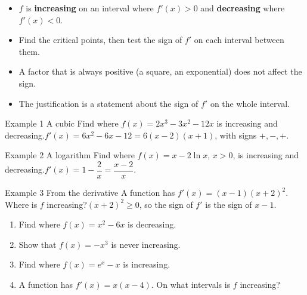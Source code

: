 \documentclass[11pt]{article}
\begin{document}

\begin{ideabox}
\begin{itemize}[leftmargin=*,itemsep=2pt,topsep=2pt]
  \item $f$ is \textbf{increasing} on an interval where $f'(x)>0$ and \textbf{decreasing} where $f'(x)<0$.
  \item Find the critical points, then test the sign of $f'$ on each interval between them.
  \item A factor that is always positive (a square, an exponential) does not affect the sign.
  \item The justification is a statement about the sign of $f'$ on the whole interval.
\end{itemize}
\end{ideabox}

\begin{example}{Example 1 \textperiodcentered{} A cubic}
Find where $f(x)=2x^3-3x^2-12x$ is increasing and decreasing.\soln $f'(x)=6x^2-6x-12=6(x-2)(x+1)$, with signs $+,-,+$.
\end{example}

\begin{example}{Example 2 \textperiodcentered{} A logarithm}
Find where $f(x)=x-2\ln x$, $x>0$, is increasing and decreasing.\soln $f'(x)=1-\dfrac2x=\dfrac{x-2}{x}$.
\end{example}

\begin{example}{Example 3 \textperiodcentered{} From the derivative}
A function has $f'(x)=(x-1)(x+2)^2$. Where is $f$ increasing?\soln $(x+2)^2\ge0$, so the sign of $f'$ is the sign of $x-1$.
\end{example}

\newpage
{}

\begin{enumerate}[leftmargin=*,itemsep=2pt]
  \item Find where $f(x)=x^2-6x$ is decreasing.\work{2.3cm}
  \item Show that $f(x)=-x^3$ is never increasing.\work{2.3cm}
  \item Find where $f(x)=e^{x}-x$ is increasing.\work{2.3cm}
  \item A function has $f'(x)=x(x-4)$. On what intervals is $f$ increasing?\work{2.3cm}
\end{enumerate}
\end{document}
